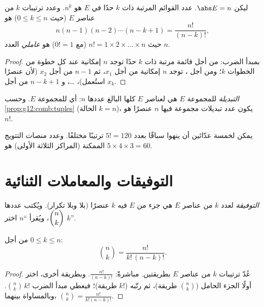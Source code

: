 \begin{proposition}\label{prop:g12:comb:tuples}
ليكن $\abs E = n$. عدد القوائم المرتبة ذات $k$ حدًا في $E$ هو $n^k$. وعدد
ترتيبات $k$ من عناصر $E$ (حيث $0 \leq k \leq n$) هو
\[
n(n-1)(n-2)\cdots(n-k+1) = \frac{n!}{(n-k)!},
\]
حيث $n! = 1 \times 2 \times \dots \times n$ (مع $0! = 1$) هو
\emph{عاملي} العدد $n$.
\end{proposition}

\begin{proof}
بمبدأ الضرب: من أجل قائمة مرتبة ذات $k$ حدًا توجد $n$ إمكانية عند كل خطوة من
الخطوات $k$؛ ومن أجل ، توجد $n$ إمكانية من أجل $x_1$، ثم $n - 1$ من أجل
$x_2$ (لأن عنصرًا استُعمل)، \dots، و $n - k + 1$ من أجل $x_k$.
\end{proof}

\begin{definition}[التبديلة]\label{def:g12:comb:permutation}
\emph{التبديلة} للمجموعة $E$ هي  لعناصر $E$ كلها
البالغ عددها $n$: أي  للمجموعة $E$. وحسب
\cref{prop:g12:comb:tuples} (الحالة $k = n$)، يكون عدد تبديلات مجموعة
فيها $n$ عنصرًا هو $n!$.
\end{definition}

\begin{example}
يمكن لخمسة عدّائين أن ينهوا سباقًا بعدد $5! = 120$ ترتيبًا مختلفًا. وعدد
منصات التتويج الممكنة (المراكز الثلاثة الأولى) هو $5 \times 4 \times 3 = 60$.
\end{example}

\section{التوفيقات والمعاملات الثنائية}

\begin{definition}[التوفيقات]\label{def:g12:comb:combination}
\emph{التوفيقة} لعدد $k$ من عناصر $E$ هي جزء
من $E$ فيه $k$ عنصرًا (بلا  وبلا تكرار). ويُكتب عددها
$\dbinom{n}{k}$، ويُقرأ ``$n$ اختر $k$''.
\end{definition}

\begin{theorem}\label{thm:g12:comb:binomformula}
من أجل $0 \leq k \leq n$:
\[
\binom{n}{k} = \frac{n!}{k!\,(n-k)!} .
\]
\end{theorem}

\begin{proof}
عُدّ ترتيبات $k$ من عناصر $E$ بطريقتين. مباشرةً:
$\frac{n!}{(n-k)!}$. وبطريقة أخرى، اختر أولًا الجزء الحامل
($\binom nk$ طريقة)، ثم رتّبه ($k!$ طريقة)؛ فيعطي مبدأ الضرب
$\binom{n}{k}\,k!$. وبالمساواة بينهما،
$\binom nk = \frac{n!}{k!(n-k)!}$.
\end{proof}

